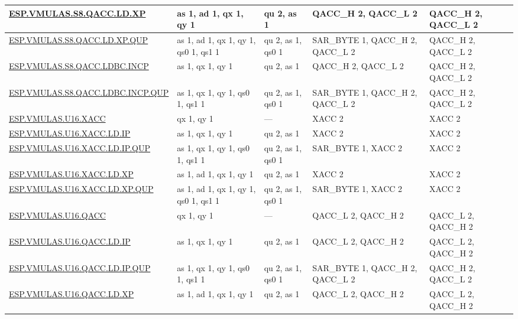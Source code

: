 \begin{longtable}[c]{|l|m{2.5cm}|m{2.5cm}|m{2.5cm}|m{2.5cm}|}
    \hyperref[instruction:ESPVMULASS8QACCLDXP]{ESP.VMULAS.S8.QACC.LD.XP} & as 1, ad 1, qx 1, qy 1 & qu 2, as 1 & QACC\_H 2, QACC\_L 2 & QACC\_H 2, QACC\_L 2\\\hline
    \hyperref[instruction:ESPVMULASS8QACCLDXPQUP]{ESP.VMULAS.S8.QACC.LD.XP.QUP} & as 1, ad 1, qx 1, qy 1, qs0 1, qs1 1 & qu 2, as 1, qs0 1 & SAR\_BYTE 1, QACC\_H 2, QACC\_L 2 & QACC\_H 2, QACC\_L 2\\\hline
    \hyperref[instruction:ESPVMULASS8QACCLDBCINCP]{ESP.VMULAS.S8.QACC.LDBC.INCP} & as 1, qx 1, qy 1 & qu 2, as 1 & QACC\_H 2, QACC\_L 2 & QACC\_H 2, QACC\_L 2\\\hline
    \hyperref[instruction:ESPVMULASS8QACCLDBCINCPQUP]{ESP.VMULAS.S8.QACC.LDBC.INCP.QUP} & as 1, qx 1, qy 1, qs0 1, qs1 1 & qu 2, as 1, qs0 1 & SAR\_BYTE 1, QACC\_H 2, QACC\_L 2 & QACC\_H 2, QACC\_L 2\\\hline
    \hyperref[instruction:ESPVMULASU16XACC]{ESP.VMULAS.U16.XACC} & qx 1, qy 1 & — & XACC 2 & XACC 2\\\hline
    \hyperref[instruction:ESPVMULASU16XACCLDIP]{ESP.VMULAS.U16.XACC.LD.IP} & as 1, qx 1, qy 1 & qu 2, as 1 & XACC 2 & XACC 2\\\hline
    \hyperref[instruction:ESPVMULASU16XACCLDIPQUP]{ESP.VMULAS.U16.XACC.LD.IP.QUP} & as 1, qx 1, qy 1, qs0 1, qs1 1 & qu 2, as 1, qs0 1 & SAR\_BYTE 1, XACC 2 & XACC 2\\\hline
    \hyperref[instruction:ESPVMULASU16XACCLDXP]{ESP.VMULAS.U16.XACC.LD.XP} & as 1, ad 1, qx 1, qy 1 & qu 2, as 1 & XACC 2 & XACC 2\\\hline
    \hyperref[instruction:ESPVMULASU16XACCLDXPQUP]{ESP.VMULAS.U16.XACC.LD.XP.QUP} & as 1, ad 1, qx 1, qy 1, qs0 1, qs1 1 & qu 2, as 1, qs0 1 & SAR\_BYTE 1, XACC 2 & XACC 2\\\hline
    \hyperref[instruction:ESPVMULASU16QACC]{ESP.VMULAS.U16.QACC} & qx 1, qy 1 & — & QACC\_L 2, QACC\_H 2 & QACC\_L 2, QACC\_H 2\\\hline
    \hyperref[instruction:ESPVMULASU16QACCLDIP]{ESP.VMULAS.U16.QACC.LD.IP} & as 1, qx 1, qy 1 & qu 2, as 1 & QACC\_L 2, QACC\_H 2 & QACC\_L 2, QACC\_H 2\\\hline
    \hyperref[instruction:ESPVMULASU16QACCLDIPQUP]{ESP.VMULAS.U16.QACC.LD.IP.QUP} & as 1, qx 1, qy 1, qs0 1, qs1 1 & qu 2, as 1, qs0 1 & SAR\_BYTE 1, QACC\_H 2, QACC\_L 2 & QACC\_H 2, QACC\_L 2\\\hline
    \hyperref[instruction:ESPVMULASU16QACCLDXP]{ESP.VMULAS.U16.QACC.LD.XP} & as 1, ad 1, qx 1, qy 1 & qu 2, as 1 & QACC\_L 2, QACC\_H 2 & QACC\_L 2, QACC\_H 2\\\hline

\end{longtable}
